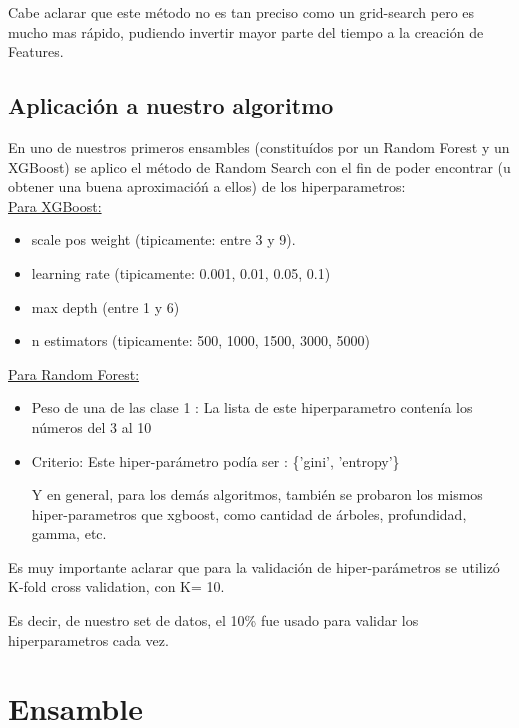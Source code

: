 \documentclass[a4paper ,12pt]{article}
\begin{document}
Cabe aclarar que este método no es tan preciso como un grid-search pero es mucho mas rápido, pudiendo invertir mayor parte del tiempo a la creación de Features.

\subsection{Aplicación a nuestro algoritmo}

En uno de nuestros primeros ensambles (constituídos por un Random Forest y un XGBoost) se aplico el método de Random Search con el fin de poder encontrar (u obtener una buena aproximacióń a ellos) de los hiperparametros:\\

\underline{Para XGBoost: }

\begin{itemize}
	\item scale pos weight (tipicamente: entre 3 y 9).
	\item learning rate (tipicamente: 0.001, 0.01, 0.05, 0.1)
	\item max depth (entre 1 y 6)
	\item n estimators (tipicamente: 500, 1000, 1500, 3000, 5000)
\end{itemize}



\underline{Para Random Forest:}

\begin{itemize}
	
	\item Peso de una de las clase 1 : La lista de este hiperparametro contenía los números del 3 al 10
	
	\item Criterio: Este hiper-parámetro podía ser : \{'gini', 'entropy'\}
	
	Y en general, para los demás algoritmos, también se probaron los mismos hiper-parametros que xgboost, como cantidad de árboles, profundidad, gamma, etc. 

\end{itemize}


Es muy importante aclarar que para la validación de hiper-parámetros se utilizó K-fold cross validation, con K= 10.

Es decir, de nuestro set de datos, el 10\% fue usado para validar los hiperparametros cada vez.


\newpage
\section{Ensamble}
\end{document}

